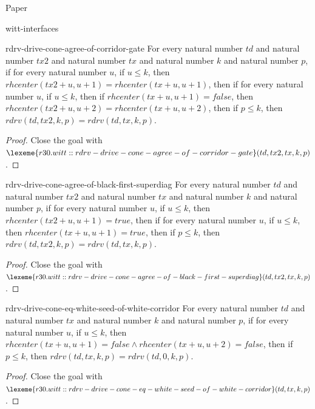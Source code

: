 \begin{lexlean}{Paper}
\begin{section}{witt-interfaces}
  \begin{theorem}{rdrv-drive-cone-agree-of-corridor-gate}
  For every natural number \(td\) and natural number \(tx2\) and natural number \(tx\) and natural number \(k\) and natural number \(p\), if for every natural number \(u\), if \(u ≤ k\), then \(rhcenter(tx2 + u, u + 1) = rhcenter(tx + u, u + 1)\), then if for every natural number \(u\), if \(u ≤ k\), then if \(rhcenter(tx + u, u + 1) = false\), then \(rhcenter(tx2 + u, u + 2) = rhcenter(tx + u, u + 2)\), then if \(p ≤ k\), then \(rdrv(td, tx2, k, p) = rdrv(td, tx, k, p)\).
  \begin{proof}
  Close the goal with \(\lexeme{r30.witt::rdrv-drive-cone-agree-of-corridor-gate}(td, tx2, tx, k, p)\).
  \end{proof}
  \end{theorem}

  \begin{theorem}{rdrv-drive-cone-agree-of-black-first-superdiag}
  For every natural number \(td\) and natural number \(tx2\) and natural number \(tx\) and natural number \(k\) and natural number \(p\), if for every natural number \(u\), if \(u ≤ k\), then \(rhcenter(tx2 + u, u + 1) = true\), then if for every natural number \(u\), if \(u ≤ k\), then \(rhcenter(tx + u, u + 1) = true\), then if \(p ≤ k\), then \(rdrv(td, tx2, k, p) = rdrv(td, tx, k, p)\).
  \begin{proof}
  Close the goal with \(\lexeme{r30.witt::rdrv-drive-cone-agree-of-black-first-superdiag}(td, tx2, tx, k, p)\).
  \end{proof}
  \end{theorem}

  \begin{theorem}{rdrv-drive-cone-eq-white-seed-of-white-corridor}
  For every natural number \(td\) and natural number \(tx\) and natural number \(k\) and natural number \(p\), if for every natural number \(u\), if \(u ≤ k\), then \(rhcenter(tx + u, u + 1) = false ∧ rhcenter(tx + u, u + 2) = false\), then if \(p ≤ k\), then \(rdrv(td, tx, k, p) = rdrv(td, 0, k, p)\).
  \begin{proof}
  Close the goal with \(\lexeme{r30.witt::rdrv-drive-cone-eq-white-seed-of-white-corridor}(td, tx, k, p)\).
  \end{proof}
  \end{theorem}


\end{section}
\end{lexlean}
